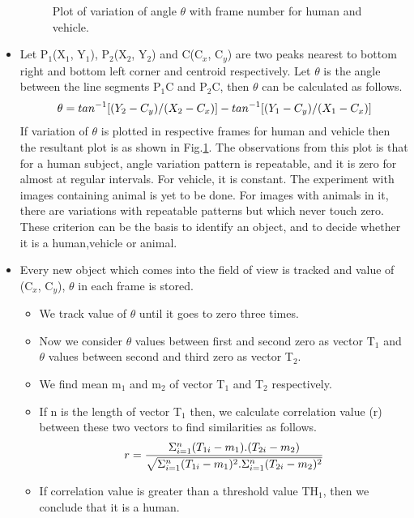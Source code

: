 \begin{itemize}
\begin{figure}[!b]
\caption{Plot of variation of angle $\theta$ with frame number for human and
vehicle.}
\label{angle_plot}
\end{figure}
\item Let P$_1$(X$_1$, Y$_1$), P$_2$(X$_2$, Y$_2$) and C(C$_x$, C$_y$)
are two peaks nearest to bottom right and bottom left corner and
centroid respectively. Let $\theta$ is the angle between the line
segments P$_1$C and P$_2$C, then $\theta$ can be calculated as
follows.\\
%
 \begin{equation}
 \theta = tan^{-1}[(Y_2 - C_y) / (X_2 - C_x)] \\ - tan^{-1}[(Y_1 - C_y) / (X_1 - C_x)]
 \end{equation}
%
\indent If variation of $\theta$ is plotted in respective frames for
human and vehicle then the resultant plot is as shown in
Fig.\ref{angle_plot}. The observations from this plot is that for a
human subject, angle variation pattern is repeatable, and it is zero for
almost at regular intervals. For vehicle, it is constant. The
experiment with images containing animal is yet to be done. For images
with animals in it, there are variations with repeatable patterns but
which never touch zero. These criterion can be the basis to identify an
object, and to decide whether it is a human,vehicle or animal.

\item Every new object which comes into the field of view is tracked and
 value of (C$_x$, C$_y$), $\theta$ in each frame is stored. 
\begin{itemize} 
\item We track value of $\theta$ until it goes to zero three times.
\item Now we consider $\theta$ values between first and second zero as
vector T$_1$ and $\theta$ values between second and third zero as vector
T$_2$.
\item We find mean m$_1$ and m$_2$ of vector T$_1$ and T$_2$ respectively.
\item If n is the length of vector T$_1$ then, we calculate correlation
value (r) between these two vectors to find similarities as follows.
 \begin{equation}
 r = {{\Sigma ^n _{i = 1}(T_{1i} - m_1) . (T_{2i} - m_2)}
\over {\sqrt {\Sigma ^n _{i = 1} (T_{1i} - m_1)^2 . \Sigma ^n _{i = 1} (T_{2i}
- m_2)^2}}}
 \end{equation}
\item If correlation value is greater than a threshold value TH$_1$,
then we conclude that it is a human.
\end{itemize} 
\end{itemize} 
